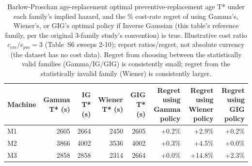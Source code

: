 \begin{table}[t]
\centering
\caption{Barlow-Proschan age-replacement optimal preventive-replacement age T* under each family's implied hazard, and the \% cost-rate regret of using Gamma's, Wiener's, or GIG's optimal policy if Inverse Gaussian (this table's reference family, per the original 3-family study's convention) is true. Illustrative cost ratio $c_{cm}/c_{pm}=3$ (Table~S6 sweeps 2-10); report ratios/regret, not absolute currency (the dataset has no cost data). Regret from choosing between the statistically valid families (Gamma/IG/GIG) is consistently small; regret from the statistically invalid family (Wiener) is consistently larger.}
\label{tab:maintenance-cost}
\begin{tabular}{lrrrrrrr}
\toprule
Machine & Gamma T* (s) & IG T* (s) & Wiener T* (s) & GIG T* (s) & Regret using Gamma policy & Regret using Wiener policy & Regret using GIG policy \\
\midrule
M1 & 2605 & 2664 & 2450 & 2605 & +0.2\% & +2.9\% & +0.2\% \\
M2 & 3866 & 4002 & 3536 & 4002 & +0.3\% & +4.5\% & +0.0\% \\
M3 & 2858 & 2858 & 2314 & 2664 & +0.0\% & +14.8\% & +2.3\% \\
\bottomrule
\end{tabular}
\end{table}
